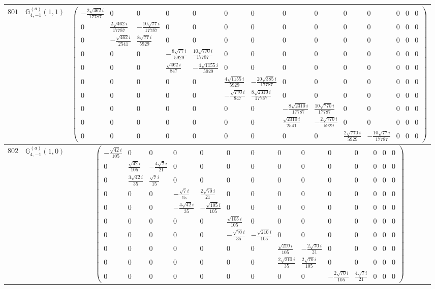 \documentclass[fleqn,8pt,landscape]{jsarticle}
\begin{document}
\begin{center}
\begin{longtable}{ccc}
$ 801 $ & $ \mathbb{G}_{4,-1}^{(a)}(1,1) $ & $ \begin{pmatrix} - \frac{2 \sqrt{462} i}{17787} & 0 & 0 & 0 & 0 & 0 & 0 & 0 & 0 & 0 & 0 & 0 & 0 & 0 \\ 0 & \frac{2 \sqrt{462} i}{17787} & - \frac{10 \sqrt{77} i}{17787} & 0 & 0 & 0 & 0 & 0 & 0 & 0 & 0 & 0 & 0 & 0 \\ 0 & - \frac{\sqrt{462} i}{2541} & \frac{8 \sqrt{77} i}{5929} & 0 & 0 & 0 & 0 & 0 & 0 & 0 & 0 & 0 & 0 & 0 \\ 0 & 0 & 0 & - \frac{8 \sqrt{77} i}{5929} & \frac{10 \sqrt{770} i}{17787} & 0 & 0 & 0 & 0 & 0 & 0 & 0 & 0 & 0 \\ 0 & 0 & 0 & \frac{\sqrt{462} i}{847} & - \frac{4 \sqrt{1155} i}{5929} & 0 & 0 & 0 & 0 & 0 & 0 & 0 & 0 & 0 \\ 0 & 0 & 0 & 0 & 0 & \frac{4 \sqrt{1155} i}{5929} & - \frac{20 \sqrt{385} i}{17787} & 0 & 0 & 0 & 0 & 0 & 0 & 0 \\ 0 & 0 & 0 & 0 & 0 & - \frac{\sqrt{770} i}{847} & \frac{8 \sqrt{2310} i}{17787} & 0 & 0 & 0 & 0 & 0 & 0 & 0 \\ 0 & 0 & 0 & 0 & 0 & 0 & 0 & - \frac{8 \sqrt{2310} i}{17787} & \frac{10 \sqrt{770} i}{17787} & 0 & 0 & 0 & 0 & 0 \\ 0 & 0 & 0 & 0 & 0 & 0 & 0 & \frac{\sqrt{2310} i}{2541} & - \frac{2 \sqrt{770} i}{5929} & 0 & 0 & 0 & 0 & 0 \\ 0 & 0 & 0 & 0 & 0 & 0 & 0 & 0 & 0 & \frac{2 \sqrt{770} i}{5929} & - \frac{10 \sqrt{77} i}{17787} & 0 & 0 & 0 \end{pmatrix} $ \\ \hline
$ 802 $ & $ \mathbb{G}_{4,-1}^{(a)}(1,0) $ & $ \begin{pmatrix} - \frac{\sqrt{42} i}{105} & 0 & 0 & 0 & 0 & 0 & 0 & 0 & 0 & 0 & 0 & 0 & 0 & 0 \\ 0 & \frac{\sqrt{42} i}{105} & - \frac{4 \sqrt{7} i}{21} & 0 & 0 & 0 & 0 & 0 & 0 & 0 & 0 & 0 & 0 & 0 \\ 0 & \frac{3 \sqrt{42} i}{35} & \frac{\sqrt{7} i}{15} & 0 & 0 & 0 & 0 & 0 & 0 & 0 & 0 & 0 & 0 & 0 \\ 0 & 0 & 0 & - \frac{\sqrt{7} i}{15} & \frac{2 \sqrt{70} i}{21} & 0 & 0 & 0 & 0 & 0 & 0 & 0 & 0 & 0 \\ 0 & 0 & 0 & - \frac{4 \sqrt{42} i}{35} & - \frac{\sqrt{105} i}{105} & 0 & 0 & 0 & 0 & 0 & 0 & 0 & 0 & 0 \\ 0 & 0 & 0 & 0 & 0 & \frac{\sqrt{105} i}{105} & 0 & 0 & 0 & 0 & 0 & 0 & 0 & 0 \\ 0 & 0 & 0 & 0 & 0 & - \frac{\sqrt{70} i}{35} & - \frac{\sqrt{210} i}{105} & 0 & 0 & 0 & 0 & 0 & 0 & 0 \\ 0 & 0 & 0 & 0 & 0 & 0 & 0 & \frac{\sqrt{210} i}{105} & - \frac{2 \sqrt{70} i}{21} & 0 & 0 & 0 & 0 & 0 \\ 0 & 0 & 0 & 0 & 0 & 0 & 0 & \frac{2 \sqrt{210} i}{35} & \frac{2 \sqrt{70} i}{105} & 0 & 0 & 0 & 0 & 0 \\ 0 & 0 & 0 & 0 & 0 & 0 & 0 & 0 & 0 & - \frac{2 \sqrt{70} i}{105} & \frac{4 \sqrt{7} i}{21} & 0 & 0 & 0 \end{pmatrix} $ \\ \hline

\end{longtable}
\end{center}
\end{document}
